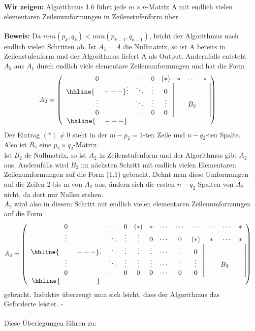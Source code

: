 \documentclass{scrbook}
\begin{document}
\textbf{Wir zeigen:} Algorithmus 1.6 führt jede \(m \times n\)-Matrix A mit endlich vielen elementaren Zeilenumformungen in Zeilenstufenform über.\\\\
\textbf{Beweis:} Da \(min(p_k,q_k)<min(p_{k-1},q_{k-1})\), bricht der Algorithmus nach endlich vielen Schritten ab. Ist \(A_1 = A\) die Nullmatrix, so ist A bereits in Zeilenstufenform und der Algorithmus liefert A als Output. Andernfalls entsteht \(A_2\) aus \(A_1\) durch endlich viele elementare Zeilenumformungen und hat die Form
\[
A_2=
\left(
\begin{array}{ccccccc}
0&\cdots&0&(*)&*&\cdots&*\\
\hhline{~~~~---}
\vdots&\ddots&\vdots&0&\multicolumn{3}{|c|}{}\\
\vdots&\ddots&\vdots&\vdots&\multicolumn{3}{|c|}{B_2}\\
0&\cdots&0&0&\multicolumn{3}{|c|}{}\\
\hhline{~~~~---}
\end{array}
\right)
\]
Der Eintrag \((*) \neq 0\) steht in der \(m-p_2 =1\)-ten Zeile und \(n-q_2\)-ten Spalte. Also ist \(B_2\) eine \(p_2\times q_2\)-Matrix.\\
Ist \(B_2\) de Nullmatrix, so ist \(A_2\) in Zeilenstufenform und der Algorithmus gibt \(A_2\) aus. Andernfalls wird \(B_2\) im nächsten Schritt mit endlich vielen Elementaren Zeilenumformungen auf die Form (1.1) gebracht. Dehnt man diese Umformungen auf die Zeilen 2 bis m von \(A_2\) aus, ändern sich die ersten \(n-q_2\) Spalten von \(A_2\) nicht, da dort nur Nullen stehen.\\
\(A_2\) wird also in diesem Schritt mit endlich vielen elementaren Zeilenumformungen auf die Form
\[
A_3=
\left(
\begin{array}{ccccccccccc}
0&\cdots&0&(*)&*&\cdots&\cdots&\cdots&\cdots&\cdots&*\\
\vdots&\ddots&\vdots&\vdots&0&\cdots&0&(*)&*&\cdots&*\\
\hhline{~~~~~~~~---}
\vdots&\ddots&\vdots&\vdots&\vdots&\cdots&\vdots&0&\multicolumn{3}{|c|}{}\\
\vdots&\ddots&\vdots&\vdots&\vdots&\cdots&\vdots&\vdots&\multicolumn{3}{|c|}{B_3}\\
0&\cdots&0&0&0&\cdots&0&0&\multicolumn{3}{|c|}{}\\
\hhline{~~~~~~~~---}
\end{array}
\right)
\]
gebracht. Induktiv überzeugt man sich leicht, dass der Algorithmus das Geforderte leistet. \(\square \)\\
\\
Diese Überlegungen führen zu:
\end{document}
